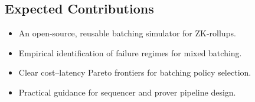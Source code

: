 \subsection{Expected Contributions}

\begin{itemize}[leftmargin=1.5em]
    \item An open-source, reusable batching simulator for ZK-rollups.
    \item Empirical identification of failure regimes for mixed batching.
    \item Clear cost–latency Pareto frontiers for batching policy selection.
    \item Practical guidance for sequencer and prover pipeline design.
\end{itemize}
